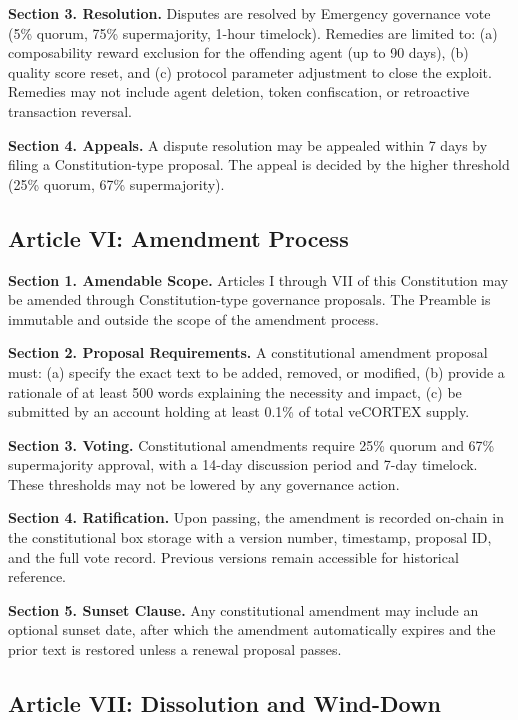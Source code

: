 \textbf{Section 3. Resolution.} Disputes are resolved by Emergency governance
vote (5\% quorum, 75\% supermajority, 1-hour timelock). Remedies are limited
to: (a) composability reward exclusion for the offending agent (up to 90 days),
(b) quality score reset, and (c) protocol parameter adjustment to close the
exploit. Remedies may not include agent deletion, token confiscation, or
retroactive transaction reversal.

\textbf{Section 4. Appeals.} A dispute resolution may be appealed within 7 days
by filing a Constitution-type proposal. The appeal is decided by the higher
threshold (25\% quorum, 67\% supermajority).

\subsection*{Article VI: Amendment Process}

\textbf{Section 1. Amendable Scope.} Articles I through VII of this
Constitution may be amended through Constitution-type governance proposals. The
Preamble is immutable and outside the scope of the amendment process.

\textbf{Section 2. Proposal Requirements.} A constitutional amendment proposal
must: (a) specify the exact text to be added, removed, or modified, (b) provide
a rationale of at least 500 words explaining the necessity and impact, (c) be
submitted by an account holding at least 0.1\% of total veCORTEX supply.

\textbf{Section 3. Voting.} Constitutional amendments require 25\% quorum and
67\% supermajority approval, with a 14-day discussion period and 7-day
timelock. These thresholds may not be lowered by any governance action.

\textbf{Section 4. Ratification.} Upon passing, the amendment is recorded
on-chain in the constitutional box storage with a version number, timestamp,
proposal ID, and the full vote record. Previous versions remain accessible
for historical reference.

\textbf{Section 5. Sunset Clause.} Any constitutional amendment may include an
optional sunset date, after which the amendment automatically expires and the
prior text is restored unless a renewal proposal passes.

\subsection*{Article VII: Dissolution and Wind-Down}

